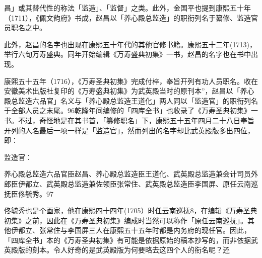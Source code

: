 \vfill
\begin{BookNotes}
\end{BookNotes}

\noindent 昌」或其替代性的称法「监造」、「监督」之类。此外，金国平也提到康熙五十年（1711），《佩文韵府》书成，赵昌以「养心殿总监造」的职衔列名于纂修、监造官员职名之中。

此外，赵昌的名字也出现在康熙五十年代的其他官修书籍。康熙五十二年(1713)，举行六旬万寿盛典。同年开始编辑《万寿盛典初集》一书，赵昌的名字也在书中出现。

康熙五十五年（1716），《万寿圣典初集》完成付梓，奉旨开列有功人员职名。收在安徽美术出版社复印的《万寿盛典初集》为武英殿当时的原刊本”，赵昌以「养心殿总监造六品官」名义与「养心殿总监造王道化」两人同以「监造官」的职衔列名于全部人员之末尾。96乾隆年间编修的「四库全书」也收录了《万寿圣典初集》一书。不过，奇怪地是在其书首，「纂修职名」下，康熙五十五年四月二十八日奉旨开列的人名最后一项一样是「监造官」，然而列出的名字却比武英殿版多出四位，即：

监造官：

\begin{BookQuote}
养心殿总监造六品官臣赵昌、养心殿总监造臣王道化、武英殿总监造兼会计司员外郎臣伊都立、武英殿总监造兼佐领臣张常住、武英殿总监造臣李国屏、原任云南巡抚臣佟毓秀。97
\end{BookQuote}

佟毓秀也是个画家，他在康熙四十四年(1705）时任云南巡抚8，在编辑《万寿圣典初集》之前，因此在《万寿圣典初集》编成时当然可以称作「原任云南巡抚」。其他伊都立、张常住与李国屏三人在康熙五十五年时都是内务府的现任官。因此，「四库全书」本的《万寿圣典初集》有可能是依据原始的稿本抄写的，而非依据武英殿版的刻本。令人好奇的是武英殿版为何要略去这四个人的衔名呢？还


